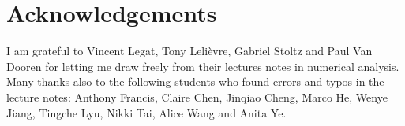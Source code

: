 \chapter*{Acknowledgements}%
\label{cha:acknowledgements}

I am grateful to Vincent Legat, Tony Lelièvre, Gabriel Stoltz and Paul Van Dooren for letting me draw freely from their lectures notes in numerical analysis.
Many thanks also to the following students who found errors and typos in the lecture notes:
Anthony Francis, Claire Chen, Jinqiao Cheng, Marco He, Wenye Jiang, Tingche Lyu, Nikki Tai, Alice Wang and Anita Ye.
